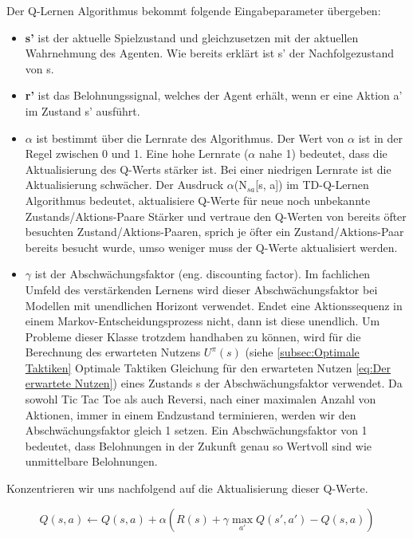 Der Q-Lernen Algorithmus bekommt folgende Eingabeparameter übergeben:

\begin{itemize}
\item \textbf{s'} ist der aktuelle Spielzustand und gleichzusetzen mit der aktuellen Wahrnehmung des Agenten. Wie bereits erklärt ist s' der Nachfolgezustand von s.

\item \textbf{r'} ist das Belohnungssignal, welches der Agent erhält, wenn er eine Aktion a' im Zustand s' ausführt. 

\item \textbf{$\alpha$} ist bestimmt über die Lernrate des Algorithmus. Der Wert von $\alpha$ ist in der Regel zwischen 0 und 1. Eine hohe Lernrate ($\alpha$ nahe 1) bedeutet, dass die Aktualisierung des Q-Werts stärker ist. Bei einer niedrigen Lernrate ist die Aktualisierung schwächer. Der Ausdruck $\alpha$(N$_{sa}$[s, a]) im TD-Q-Lernen Algorithmus bedeutet, aktualisiere Q-Werte für neue noch unbekannte Zustands/Aktions-Paare Stärker und vertraue den Q-Werten von bereits öfter besuchten Zustand/Aktions-Paaren, sprich je öfter ein Zustand/Aktions-Paar bereits besucht wurde, umso weniger muss der Q-Werte aktualisiert werden.

\item \textbf{$\gamma$} ist der Abschwächungsfaktor (eng. discounting factor). Im fachlichen Umfeld des verstärkenden Lernens wird dieser Abschwächungsfaktor bei Modellen mit unendlichen Horizont verwendet. Endet eine Aktionssequenz in einem Markov-Entscheidungsprozess nicht, dann ist diese unendlich. Um Probleme dieser Klasse trotzdem handhaben zu können, wird für die Berechnung des erwarteten Nutzens $U^\pi(s)$ (siehe \ref{subsec:Optimale Taktiken} Optimale Taktiken Gleichung für den erwarteten Nutzen \ref{eq:Der erwartete Nutzen}) eines Zustands s der Abschwächungsfaktor verwendet. Da sowohl Tic Tac Toe als auch Reversi, nach einer maximalen Anzahl von Aktionen, immer in einem Endzustand terminieren, werden wir den Abschwächungsfaktor gleich 1 setzen. Ein Abschwächungsfaktor von 1 bedeutet, dass Belohnungen in der Zukunft genau so Wertvoll sind wie unmittelbare Belohnungen. 
\end{itemize} 

Konzentrieren wir uns nachfolgend auf die Aktualisierung dieser Q-Werte.

\begin{equation} \label{eq:TD-Q-Aktualisierungsgleichung}
Q(s,a) \leftarrow Q(s,a) + \alpha(R(s) + \gamma \max_{a'} Q(s', a') - Q(s,a))
\end{equation}



